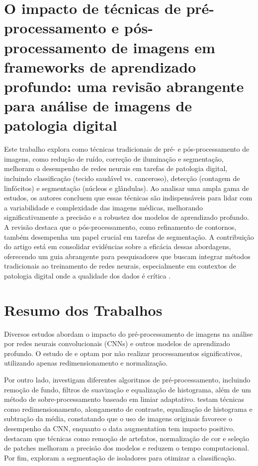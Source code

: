 \section{O impacto de técnicas de pré-processamento e pós-processamento de imagens em frameworks de aprendizado profundo: uma revisão abrangente para análise de imagens de patologia digital}
Este trabalho explora como técnicas tradicionais de pré- e pós-processamento de imagens, como redução de ruído, correção de iluminação e segmentação, melhoram o desempenho de redes neurais em tarefas de patologia digital, incluindo classificação (tecido saudável vs. canceroso), detecção (contagem de linfócitos) e segmentação (núcleos e glândulas). Ao analisar uma ampla gama de estudos, os autores concluem que essas técnicas são indispensáveis para lidar com a variabilidade e complexidade das imagens médicas, melhorando significativamente a precisão e a robustez dos modelos de aprendizado profundo. A revisão destaca que o pós-processamento, como refinamento de contornos, também desempenha um papel crucial em tarefas de segmentação. A contribuição do artigo está em consolidar evidências sobre a eficácia dessas abordagens, oferecendo um guia abrangente para pesquisadores que buscam integrar métodos tradicionais ao treinamento de redes neurais, especialmente em contextos de patologia digital onde a qualidade dos dados é crítica \cite{Salvi2021}.

\section{Resumo dos Trabalhos}

Diversos estudos abordam o impacto do pré-processamento de imagens na análise por redes neurais convolucionais (CNNs) e outros modelos de aprendizado profundo. O estudo de  e  optam por não realizar processamentos significativos, utilizando apenas redimensionamento e normalização.

Por outro lado,  investigam diferentes algoritmos de pré-processamento, incluindo remoção de fundo, filtros de suavização e equalização de histograma, além de um método de sobre-processamento baseado em limiar adaptativo.  testam técnicas como redimensionamento, alongamento de contraste, equalização de histograma e subtração da média, constatando que o uso de imagens originais favorece o desempenho da CNN, enquanto o data augmentation tem impacto positivo.  destacam que técnicas como remoção de artefatos, normalização de cor e seleção de patches melhoram a precisão dos modelos e reduzem o tempo computacional. Por fim,  exploram a segmentação de isoladores para otimizar a classificação.

